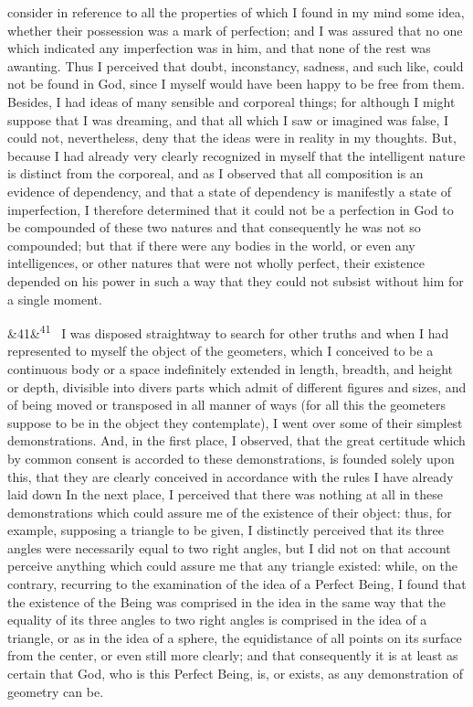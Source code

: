 \documentclass[12pt]{article}
\newcommand{\para}[1][]{\par\noindent\ifx&#1&\else\textsuperscript{\footnotesize #1}~\fi}
\begin{document}
consider in reference to all the properties of which I found in my mind some idea, whether their possession was a mark of perfection; and I was assured that no one which indicated any imperfection was in him, and that none of the rest was awanting. Thus I perceived that doubt, inconstancy, sadness, and such like, could not be found in God, since I myself would have been happy to be free from them. Besides, I had ideas of many sensible and corporeal things; for although I might suppose that I was dreaming, and that all which I saw or imagined was false, I could not, nevertheless, deny that the ideas were in reality in my thoughts. But, because I had already very clearly recognized in myself that the intelligent nature is distinct from the corporeal, and as I observed that all composition is an evidence of dependency, and that a state of dependency is manifestly a state of imperfection, I therefore determined that it could not be a perfection in God to be compounded of these two natures and that consequently he was not so compounded; but that if there were any bodies in the world, or even any intelligences, or other natures that were not wholly perfect, their existence depended on his power in such a way that they could not subsist without him for a single moment.

\para[41] I was disposed straightway to search for other truths and when I had represented to myself the object of the geometers, which I conceived to be a continuous body or a space indefinitely extended in length, breadth, and height or depth, divisible into divers parts which admit of different figures and sizes, and of being moved or transposed in all manner of ways (for all this the geometers suppose to be in the object they contemplate), I went over some of their simplest demonstrations. And, in the first place, I observed, that the great certitude which by common consent is accorded to these demonstrations, is founded solely upon this, that they are clearly conceived in accordance with the rules I have already laid down In the next place, I perceived that there was nothing at all in these demonstrations which could assure me of the existence of their object: thus, for example, supposing a triangle to be given, I distinctly perceived that its three angles were necessarily equal to two right angles, but I did not on that account perceive anything which could assure me that any triangle existed: while, on the contrary, recurring to the examination of the idea of a Perfect Being, I found that the existence of the Being was comprised in the idea in the same way that the equality of its three angles to two right angles is comprised in the idea of a triangle, or as in the idea of a sphere, the equidistance of all points on its surface from the center, or even still more clearly; and that consequently it is at least as certain that God, who is this Perfect Being, is, or exists, as any demonstration of geometry can be.
\end{document}
